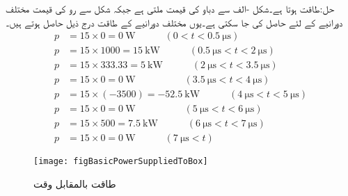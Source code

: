 حل:طاقت  ہوتا ہے۔شکل -الف سے دباو کی قیمت  ملتی ہے جبکہ شکل  سے رو کی قیمت مختلف دورانیے کے لئے حاصل کی جا سکتی ہے۔یوں مختلف دورانیے کے طاقت درج ذیل حاصل ہوتے ہیں۔
\begin{align*}
p&=15 \times 0=\SI{0}{\watt} \quad \quad \quad (0<t<\SI{0.5}{\micro\second}) \\
p&=15 \times 1000=\SI{15}{\kilo\watt} \quad \quad \quad (\SI{0.5}{\micro\second}<t<\SI{2}{\micro\second}) \\
p&=15 \times 333.33=\SI{5}{\kilo\watt} \quad \quad \quad (\SI{2}{\micro\second}<t<\SI{3.5}{\micro\second}) \\
p&=15 \times 0=\SI{0}{\watt} \quad \quad \quad \quad\quad (\SI{3.5}{\micro\second}<t<\SI{4}{\micro\second}) \\
p&=15 \times (-3500)=\SI{-52.5}{\kilo\watt} \quad \quad \quad (\SI{4}{\micro\second}<t<\SI{5}{\micro\second}) \\
p&=15 \times 0=\SI{0}{\watt} \quad \quad \quad \quad\quad (\SI{5}{\micro\second}<t<\SI{6}{\micro\second}) \\
p&=15 \times 500=\SI{7.5}{\kilo\watt} \quad \quad \quad (\SI{6}{\micro\second}<t<\SI{7}{\micro\second}) \\
p&=15 \times 0=\SI{0}{\watt} \quad \quad \quad (\SI{7}{\micro\second}<t) 
\end{align*}

\begin{figure}
\centering
\texttt{[image: figBasicPowerSuppliedToBox]}
\caption{طاقت بالمقابل وقت}
\label{شکل_بنیادی_طاقت_بالمقابل_وقت}
\end{figure}

